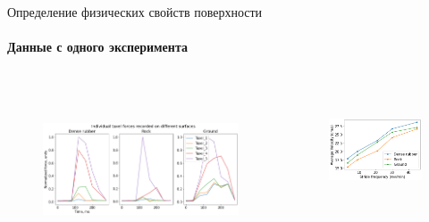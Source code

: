 \documentclass[aspectratio=169,xcolor=table]{beamer}
\begin{document}
\begin{frame}[t]{Определение физических свойств поверхности}
    \framesubtitle{Данные с одного эксперимента}
    \begin{columns}[T,onlytextwidth]
        \begin{column}{0.60\textwidth}
            \begin{figure}[H]
                \centering\includegraphics[height=5cm,width=1\textwidth,keepaspectratio]{s_shape_leg/TaxelIndForce.png}
            \end{figure}
        \end{column}
        \begin{column}{0.35\textwidth}
            \vspace{-1.4cm}
            \begin{figure}[H]
                    \centering\includegraphics[height=3.8cm,width=1\textwidth,keepaspectratio]{s_shape_leg/avg_lin_vel_rev_min.png} 
            \end{figure}

            
        \end{column}
    \end{columns}
\end{frame}
\end{document}
